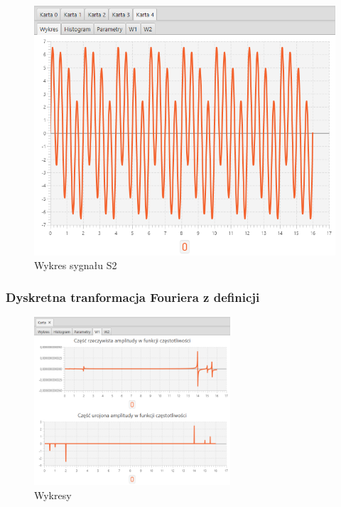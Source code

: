 \documentclass[12pt]{article}
\begin{document}
{{            \begin{figure}[H]
                \centering
                \includegraphics[width=\textwidth]{img/result/s2/data_134731.png}
                \caption{Wykres sygnału S2}
            \end{figure}
            \newpage

            \subsubsection{Dyskretna tranformacja Fouriera z definicji} {

                \begin{figure}[H]
                    \centering
                    \includegraphics[width=0.65\textwidth]{img/result/s2/01/W1_draw_1_sinus_sampling_trans_s2_data_205737.png}
                    \caption{Wykresy}
                \end{figure}

}}}
\end{document}
